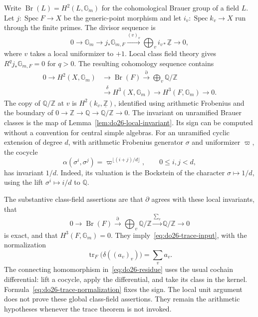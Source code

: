 Write \(\operatorname{Br}(L)=H^2(L,\mathbb G_m)\) for the
cohomological Brauer group of a field \(L\).
Let \(j:\operatorname{Spec}F\to X\) be the generic-point morphism and
let \(i_v:\operatorname{Spec}k_v\to X\) run through the finite primes.
The divisor sequence is
\[
 0\longrightarrow\mathbb G_m\longrightarrow j_*\mathbb G_{m,F}
   \xrightarrow{(v)_v}\bigoplus_v i_{v*}\underline{\mathbb Z}
   \longrightarrow0,
\]
where \(v\) takes a local uniformizer to \(+1\).
Local class field theory gives \(R^qj_*\mathbb G_{m,F}=0\) for
\(q>0\).  The resulting cohomology sequence contains
\begin{equation}
\label{eq:do26-residue}
\begin{split}
0\longrightarrow H^2(X,\mathbb G_m)&\longrightarrow\operatorname{Br}(F)
 \xrightarrow{\partial}\bigoplus_v\mathbb Q/\mathbb Z\\
 &\xrightarrow{\delta}H^3(X,\mathbb G_m)
 \longrightarrow H^3(F,\mathbb G_m)\longrightarrow0.
\end{split}
\end{equation}
The copy of \(\mathbb Q/\mathbb Z\) at \(v\) is
\(H^2(k_v,\underline{\mathbb Z})\), identified using arithmetic
Frobenius and the boundary of
\(0\to\mathbb Z\to\mathbb Q\to\mathbb Q/\mathbb Z\to0\).
The invariant on unramified Brauer classes is
the map of Lemma~\ref{lem:do26-local-invariant}.  Its sign can be
computed without a convention for central simple algebras.  For an
unramified cyclic extension of degree \(d\), with arithmetic Frobenius
generator \(\sigma\) and uniformizer \(\varpi\), the cocycle
\[
 \alpha(\sigma^i,\sigma^j)=
          \varpi^{\lfloor(i+j)/d\rfloor},\qquad 0\leq i,j<d,
\]
has invariant \(1/d\).  Indeed, its valuation is the Bockstein of the
character \(\sigma\mapsto1/d\), using the lift
\(\sigma^i\mapsto i/d\) to \(\mathbb Q\).

The substantive class-field assertions are that \(\partial\) agrees
with these local invariants, that
\[
 0\longrightarrow\operatorname{Br}(F)
  \xrightarrow{\partial}\bigoplus_v\mathbb Q/\mathbb Z
  \xrightarrow{\sum_v}\mathbb Q/\mathbb Z\longrightarrow0
\]
is exact, and that \(H^3(F,\mathbb G_m)=0\).
They imply~\eqref{eq:do26-trace-input}, with the normalization
\begin{equation}
\label{eq:do26-trace-normalization}
 \operatorname{tr}_F\bigl(\delta((a_v)_v)\bigr)=\sum_v a_v.
\end{equation}
The connecting homomorphism in~\eqref{eq:do26-residue} uses the usual
cochain differential: lift a cocycle, apply the differential, and take its
class in the kernel.  Formula~\eqref{eq:do26-trace-normalization} fixes
the sign.  The local unit argument does not prove these global class-field
assertions.  They remain the arithmetic hypotheses whenever the trace
theorem is not invoked.

